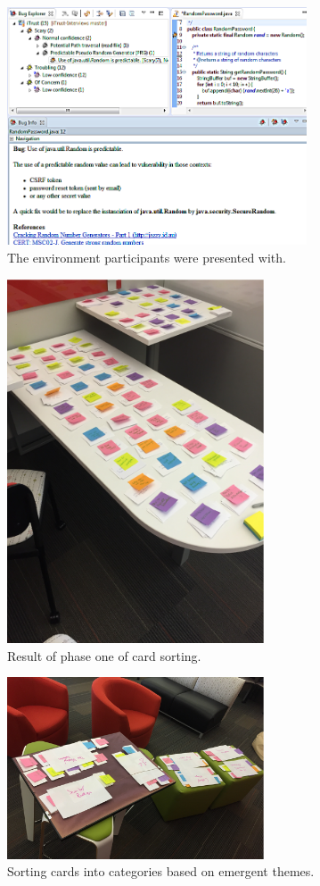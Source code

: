 \documentclass[conference]{IEEEtran}
\begin{document}


%
\clearpage
\appendix

\begin{figure}[h]
\centering
\includegraphics[width=3.5in]{Images/environment.png}
\caption{The environment participants were presented with.}
\label{fig:environment} 
\end{figure}
\begin{figure}[h]
\centering
\includegraphics[width=3in]{Images/notecards.pdf}
\caption{Result of phase one of card sorting.}
\label{fig:stageOne} 
\end{figure}
\begin{figure}[h]
\centering
\includegraphics[width=3in]{Images/categories.pdf}
\caption{Sorting cards into categories based on emergent themes.}
\label{fig:cardsort} 
\end{figure}


\end{document}
